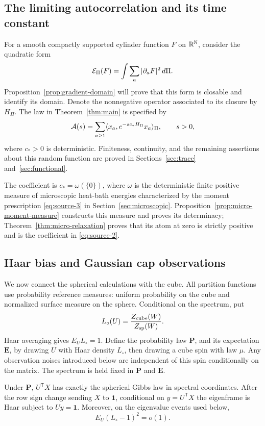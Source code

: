 \subsection{The limiting autocorrelation and its time constant}

For a smooth compactly supported cylinder function $F$ on $\mathbb R^{\mathbb N}$,
consider the quadratic form
\[
 \mathcal E_\Pi(F)=\int\sum_a|\partial_aF|^2\,d\Pi.
\]
Proposition~\ref{prop:gradient-domain} will prove that this form is
closable and identify its domain.  Denote the nonnegative operator associated
to its closure by $H_\Pi$.  The law in Theorem~\ref{thm:main} is specified by
\begin{equation}\label{eq:source-2}
 \mathcal A(s)=\sum_{a\ge1}
 \langle x_a,e^{-s c_*H_\Pi}x_a\rangle_\Pi,
 \qquad s>0,
\end{equation}
where $c_*>0$ is deterministic.  Finiteness, continuity, and the remaining
assertions about this random function are proved in
Sections~\ref{sec:trace} and~\ref{sec:functional}.

The coefficient is $c_*=\omega(\{0\})$, where $\omega$ is the
deterministic finite positive measure of microscopic heat-bath energies
characterized by the moment prescription \eqref{eq:source-3} in
Section~\ref{sec:microscopic}.  Proposition~\ref{prop:micro-moment-measure}
constructs this measure and proves its determinacy;
Theorem~\ref{thm:micro-relaxation} proves that its atom at zero is strictly
positive and is the coefficient in \eqref{eq:source-2}.

\subsection{Haar bias and Gaussian cap observations}

We now connect the spherical calculations with the cube.  All partition
functions use probability reference measures: uniform probability on the
cube and normalized surface measure on the sphere.  Conditional on the
spectrum, put
\[
 L_\circ(U)=\frac{Z_{\rm cube}(W)}{Z_{\rm sp}(W)}.
\]
Haar averaging gives $E_U L_\circ=1$.  Define the probability law
$\mathbf P$, and its expectation $\mathbf E$, by drawing $U$ with
Haar density $L_\circ$, then drawing a cube spin with law $\mu$.
Any observation noises introduced below are independent of this spin
conditionally on the matrix.  The spectrum is held fixed in
$\mathbf P$ and $\mathbf E$.

\begin{lemma}
\label{lem:edge-biased-law}
Under $\mathbf P$, $U^{\mathsf T}X$ has exactly the spherical Gibbs law
in spectral coordinates.  After the row sign change sending $X$ to
$\mathbf1$, conditional on $y=U^{\mathsf T}X$ the eigenframe is Haar
subject to $Uy=\mathbf1$.  Moreover, on the eigenvalue events used below,
\begin{equation}\label{eq:edge-uncapped-comparison}
 E_U(L_\circ-1)^2=o(1).
\end{equation}
\end{lemma}


